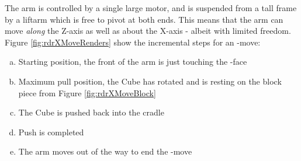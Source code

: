 \documentclass{report}
\newcommand{\tit}[1]{\textit{#1}}
\newcommand{\face}[1]{\uppercase{\texttt{\formatmovesnospace{#1}}}-face}
\newcommand{\move}[1]{\uppercase{\texttt{\formatmovesnospace{#1}}}-move}
\begin{document}
    The arm is controlled by a single large motor, and is suspended from a tall frame by a liftarm which is free to pivot at both ends. This means that the arm can move \tit{along} the Z-axis as well as about the X-axis - albeit with limited freedom. Figure \ref{fig:rdrXMoveRenders} show the incremental steps for an \move{x}: 
    
    \begin{enumerate}[a)]
    	\item Starting position, the front of the arm is just touching the \face{f}
    	\item Maximum pull position, the Cube has rotated and is resting on the block piece from Figure \ref{fig:rdrXMoveBlock}
    	\item The Cube is pushed back into the cradle
    	\item Push is completed
    	\item The arm moves out of the way to end the \move{x}
    \end{enumerate}
    
\end{document}
